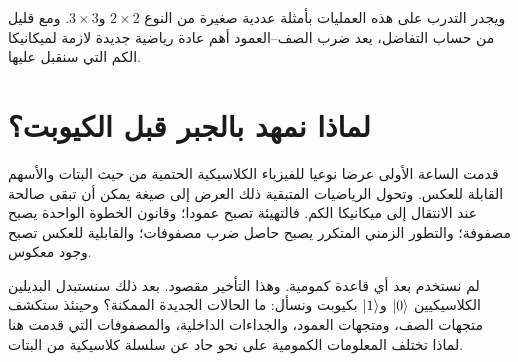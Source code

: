 ويجدر التدرب على هذه العمليات بأمثلة عددية صغيرة من النوع \(2\times2\) و\(3\times3\). ومع قليل من حساب التفاضل، يعد ضرب الصف--العمود أهم عادة رياضية جديدة لازمة لميكانيكا الكم التي سنقبل عليها.

\begin{classroomqa}
\end{classroomqa}

\section{لماذا نمهد بالجبر قبل الكيوبت؟}

قدمت الساعة الأولى عرضا نوعيا للفيزياء الكلاسيكية الحتمية من حيث البتات والأسهم القابلة للعكس. وتحول الرياضيات المتبقية ذلك العرض إلى صيغة يمكن أن تبقى صالحة عند الانتقال إلى ميكانيكا الكم. فالتهيئة تصبح عمودا؛ وقانون الخطوة الواحدة يصبح مصفوفة؛ والتطور الزمني المتكرر يصبح حاصل ضرب مصفوفات؛ والقابلية للعكس تصبح وجود معكوس.

لم نستخدم بعد أي قاعدة كمومية. وهذا التأخير مقصود. بعد ذلك سنستبدل البديلين الكلاسيكيين \(\left\lvert0\right\rangle\) و\(\left\lvert1\right\rangle\) بكيوبت ونسأل: ما الحالات الجديدة الممكنة؟ وحينئذ ستكشف متجهات الصف، ومتجهات العمود، والجداءات الداخلية، والمصفوفات التي قدمت هنا لماذا تختلف المعلومات الكمومية على نحو حاد عن سلسلة كلاسيكية من البتات.

\begin{classroomqa}
\end{classroomqa}
